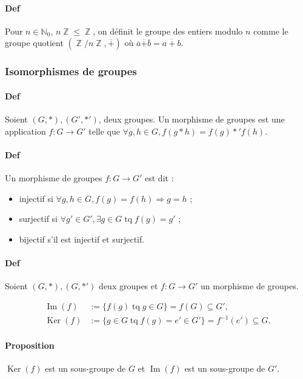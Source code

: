 \documentclass{article}
\DeclareMathOperator{\tq}{\text{ tq }}
\DeclareMathOperator{\Z}{\mathbb Z}
\DeclareMathOperator{\Imappl}{Im}
\DeclareMathOperator{\Ker}{Ker}
\begin{document}
			\paragraph{Def} Pour $n \in \mathbb N_0$, $n\Z \leq \Z$, on définit le groupe des entiers modulo $n$ comme le groupe quotient $(\Z/n\Z, \overline{+})$
			où $\overline{a} \overline{+} \overline{b} = \overline{a+b}$.

			\subsubsection{Isomorphismes de groupes}

			\paragraph{Def} Soient $(G, *), (G', *')$, deux groupes. Un morphisme de groupes est une application $f : G \to G'$ telle que
			$\forall g, h \in G, f(g*h) = f(g) *' f(h)$.

			\paragraph{Def} Un morphisme de groupes $f : G \to G'$ est dit :

			\begin{itemize}
				\item injectif si $\forall g, h \in G, f(g) = f(h) \Rightarrow g = h$ ;
				\item surjectif si $\forall g' \in G', \exists g \in G \tq f(g) = g'$ ;
				\item bijectif s'il est injectif et surjectif.
			\end{itemize}

			\paragraph{Def} Soient $(G, *), (G, *')$ deux groupes et $f : G \to G'$ un morphisme de groupes.

				\[\begin{aligned}
					\Imappl(f) &:= \{f(g) \tq g \in G\} = f(G) \subseteq G', \\
					\Ker(f)	&:= \{g \in G \tq f(g) = e' \in G'\} = f^{-1}(e') \subseteq G.
				\end{aligned}\]

			\paragraph{Proposition} $\Ker(f)$ est un sous-groupe de $G$ et $\Imappl(f)$ est un sous-groupe de $G'$.
\end{document}
